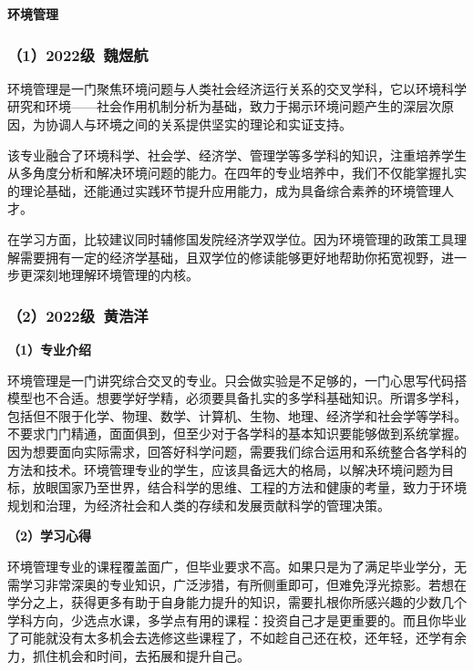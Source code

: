 \vspace{10pt}

\textbf{环境管理}

\subsubsection{（1）2022级\ 魏煜航}

环境管理是一门聚焦环境问题与人类社会经济运行关系的交叉学科，它以环境科学研究和环境——社会作用机制分析为基础，致力于揭示环境问题产生的深层次原因，为协调人与环境之间的关系提供坚实的理论和实证支持。

\vspace{10pt}

该专业融合了环境科学、社会学、经济学、管理学等多学科的知识，注重培养学生从多角度分析和解决环境问题的能力。在四年的专业培养中，我们不仅能掌握扎实的理论基础，还能通过实践环节提升应用能力，成为具备综合素养的环境管理人才。

\vspace{10pt}

在学习方面，比较建议同时辅修国发院经济学双学位。因为环境管理的政策工具理解需要拥有一定的经济学基础，且双学位的修读能够更好地帮助你拓宽视野，进一步更深刻地理解环境管理的内核。

\subsubsection{（2）2022级\ 黄浩洋}

\textbf{（1）专业介绍}

环境管理是一门讲究综合交叉的专业。只会做实验是不足够的，一门心思写代码搭模型也不合适。想要学好学精，必须要具备扎实的多学科基础知识。所谓多学科，包括但不限于化学、物理、数学、计算机、生物、地理、经济学和社会学等学科。不要求门门精通，面面俱到，但至少对于各学科的基本知识要能够做到系统掌握。因为想要面向实际需求，回答好科学问题，需要我们综合运用和系统整合各学科的方法和技术。环境管理专业的学生，应该具备远大的格局，以解决环境问题为目标，放眼国家乃至世界，结合科学的思维、工程的方法和健康的考量，致力于环境规划和治理，为经济社会和人类的存续和发展贡献科学的管理决策。

\vspace{10pt}

\textbf{（2）学习心得}

环境管理专业的课程覆盖面广，但毕业要求不高。如果只是为了满足毕业学分，无需学习非常深奥的专业知识，广泛涉猎，有所侧重即可，但难免浮光掠影。若想在学分之上，获得更多有助于自身能力提升的知识，需要扎根你所感兴趣的少数几个学科方向，少选点水课，多学点有用的课程：投资自己才是更重要的。而且你毕业了可能就没有太多机会去选修这些课程了，不如趁自己还在校，还年轻，还学有余力，抓住机会和时间，去拓展和提升自己。

